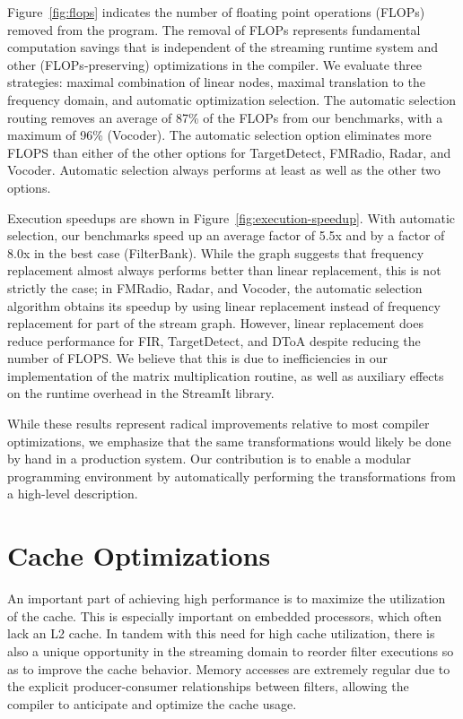 Figure~\ref{fig:flops} indicates the number of floating point
operations (FLOPs) removed from the program.  The removal of FLOPs
represents fundamental computation savings that is independent of the
streaming runtime system and other (FLOPs-preserving) optimizations in
the compiler.  We evaluate three strategies: maximal combination of
linear nodes, maximal translation to the frequency domain, and
automatic optimization selection.  The automatic selection routing
removes an average of 87\% of the FLOPs from our benchmarks, with a
maximum of 96\% (Vocoder).  The automatic selection option eliminates
more FLOPS than either of the other options for TargetDetect, FMRadio,
Radar, and Vocoder.  Automatic selection always performs at least as
well as the other two options.

Execution speedups are shown in Figure~\ref{fig:execution-speedup}.
With automatic selection, our benchmarks speed up an average factor of
5.5x and by a factor of 8.0x in the best case (FilterBank).  While the
graph suggests that frequency replacement almost always performs
better than linear replacement, this is not strictly the case; in
FMRadio, Radar, and Vocoder, the automatic selection algorithm obtains
its speedup by using linear replacement instead of frequency
replacement for part of the stream graph.  However, linear replacement
does reduce performance for FIR, TargetDetect, and DToA despite
reducing the number of FLOPS.  We believe that this is due to
inefficiencies in our implementation of the matrix multiplication
routine, as well as auxiliary effects on the runtime overhead in the
StreamIt library.

While these results represent radical improvements relative to most
compiler optimizations, we emphasize that the same transformations
would likely be done by hand in a production system.  Our contribution
is to enable a modular programming environment by automatically
performing the transformations from a high-level description.

\section{Cache Optimizations}

An important part of achieving high performance is to maximize the
utilization of the cache.  This is especially important on embedded
processors, which often lack an L2 cache.  In tandem with this need
for high cache utilization, there is also a unique opportunity in the
streaming domain to reorder filter executions so as to improve the
cache behavior.  Memory accesses are extremely regular due to the
explicit producer-consumer relationships between filters, allowing the
compiler to anticipate and optimize the cache usage.

